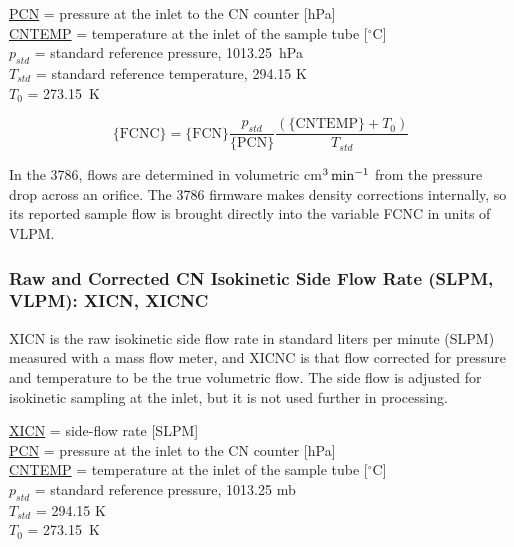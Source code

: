 \documentclass[
]{book}
\begin{document}
\protect\hyperlink{pcn}{PCN} = pressure at the inlet to the CN counter {[}hPa{]}\\
\protect\hyperlink{cntemp}{CNTEMP} = temperature at the inlet of the sample tube {[}\(^{\circ}\)C{]}\\
\(p_{std}\) = standard
reference pressure, 1013.25~hPa\\
\(T_{std}\) = standard
reference temperature, 294.15 K\\
\(T_{0}\) = 273.15~K

\begin{equation}
\mathrm{\{FCNC\} = \{FCN\}}\frac{p_{std}}{\mathrm{\{PCN\}}}\frac{(\{\mathrm{CNTEMP\}}+T_{0})}{T_{std}}
\label{eq:FCNCbox}
\end{equation}

In the 3786, flows are determined in volumetric cm{\(^{3}\thinspace\mathrm{min}^{-1}\)} from the pressure drop across an orifice. The 3786 firmware makes density corrections internally, so its reported sample flow is brought directly into the variable FCNC in units of VLPM.

\hypertarget{xicnc}{%
\subsubsection*{Raw and Corrected CN Isokinetic Side Flow Rate (SLPM, VLPM): XICN, XICNC}\label{xicnc}}

XICN is the raw isokinetic side flow rate in standard liters per minute (SLPM) measured with a mass flow meter, and XICNC is that flow corrected for pressure and temperature to be the true volumetric flow. The side flow is adjusted for isokinetic sampling at the inlet, but it is not used further in processing.

\protect\hyperlink{xicnc}{XICN} = side-flow rate {[}SLPM{]}\\
\protect\hyperlink{pcn}{PCN} = pressure at the inlet to the CN counter {[}hPa{]}\\
\protect\hyperlink{cntemp}{CNTEMP} = temperature at the inlet of the sample tube {[}\(^{\circ}\)C{]}\\
\(p_{std}\) = standard reference pressure, 1013.25 mb\\
\(T_{std}\)
= 294.15 K\\
\(T_{0}\) = 273.15~K
\end{document}

